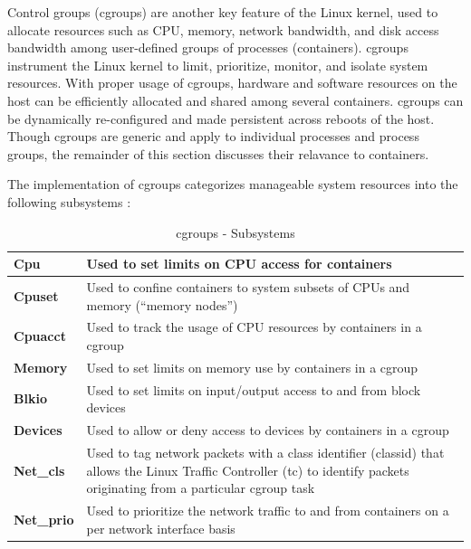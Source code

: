 Control groups (cgroups) \cite{cgroups} \cite{cgroups-rami-rosen} \cite{cgroups-redhat} are another key feature of the Linux kernel, used to allocate resources such as CPU, memory, network bandwidth, and disk access bandwidth among user-defined groups of processes (containers). cgroups instrument the Linux kernel to limit, prioritize, monitor, and isolate system resources. With proper usage of cgroups, hardware and software resources on the host can be efficiently allocated and shared among several containers. cgroups can be dynamically re-configured and made persistent across reboots of the host. Though cgroups are generic and apply to individual processes and process groups, the remainder of this section discusses their relavance to containers.

The implementation of cgroups categorizes manageable system resources into the following subsystems : 

\begin{table}[h!]
\begin{center}
\renewcommand{\arraystretch}{2.0}
\begin{tabular}{ | p{1.5cm} | p{12.5cm} | }
  \hline                 
  \textbf{Cpu} & Used to set limits on CPU access for containers \\ \hline       
  \textbf{Cpuset} & Used to confine containers to system subsets of CPUs and memory (“memory nodes”) \\ \hline
  \textbf{Cpuacct} & Used to track the usage of CPU resources by containers in a cgroup \\ \hline
  \textbf{Memory} & Used to set limits on memory use by containers in a cgroup \\ \hline
  \textbf{Blkio} & Used to set limits on input/output access to and from block devices \\ \hline
  \textbf{Devices} & Used to allow or deny access to devices by containers in a cgroup \\ \hline
  \textbf{Net\_cls} & Used to tag network packets with a class identifier (classid) that allows the Linux Traffic Controller (tc) to identify packets originating from a particular cgroup task \\ \hline
  \textbf{Net\_prio} & Used to prioritize the network traffic to and from containers on a per network interface basis \\ \hline
\end{tabular}
\end{center}
\caption{cgroups - Subsystems}
\end{table}

